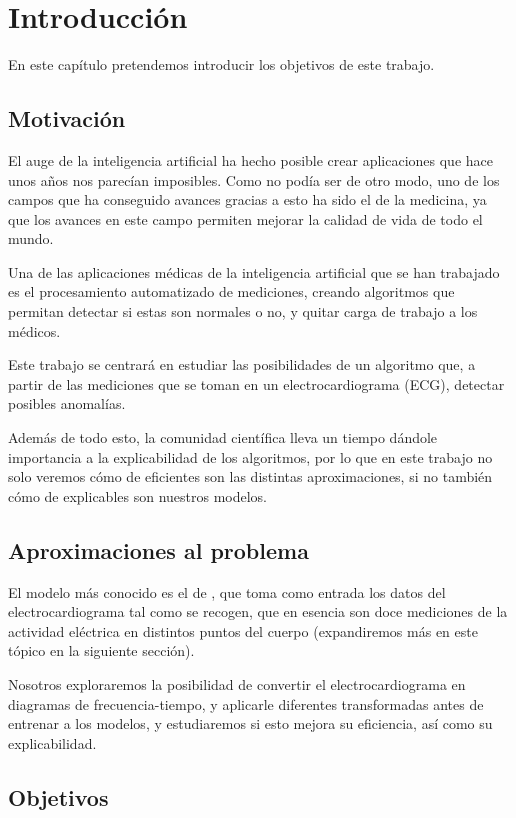 \chapter{Introducción}
\label{cap:introduccion}
\begin{resumen}
	En este capítulo pretendemos introducir los objetivos de este trabajo.
\end{resumen}

\section{Motivación}
El auge de la inteligencia artificial ha hecho posible crear aplicaciones que hace unos años nos parecían imposibles. Como no podía ser de otro modo, uno de los campos que ha conseguido avances gracias a esto ha sido el de la medicina, ya que los avances en este campo permiten mejorar la calidad de vida de todo el mundo.

Una de las aplicaciones médicas de la inteligencia artificial que se han trabajado es el procesamiento automatizado de mediciones, creando algoritmos que permitan detectar si estas son normales o no, y quitar carga de trabajo a los médicos.

Este trabajo se centrará en estudiar las posibilidades de un algoritmo que, a partir de las mediciones que se toman en un electrocardiograma (ECG), detectar posibles anomalías.

Además de todo esto, la comunidad científica lleva un tiempo dándole importancia a la explicabilidad de los algoritmos, por lo que en este trabajo no solo veremos cómo de eficientes son las distintas aproximaciones, si no también cómo de explicables son nuestros modelos.
\section{Aproximaciones al problema}
El modelo más conocido es el de \cite{ribeiro}, que toma como entrada los datos del electrocardiograma tal como se recogen, que en esencia son doce mediciones de la actividad eléctrica en distintos puntos del cuerpo (expandiremos más en este tópico en la siguiente sección).

Nosotros exploraremos la posibilidad de convertir el electrocardiograma en diagramas de frecuencia-tiempo, y aplicarle diferentes transformadas antes de entrenar a los modelos, y estudiaremos si esto mejora su eficiencia, así como su explicabilidad.

\section{Objetivos}

